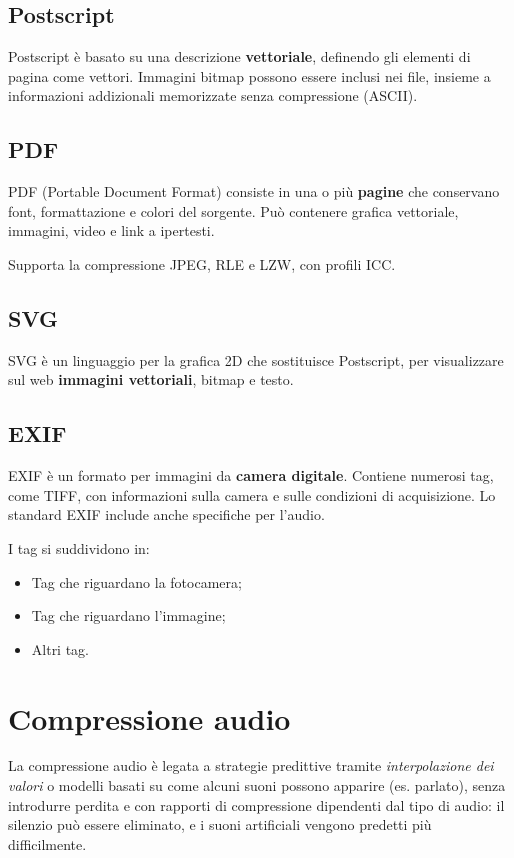  \subsection{Postscript}
 Postscript è basato su una descrizione \textbf{vettoriale}, definendo gli elementi di pagina come vettori. Immagini bitmap possono essere inclusi nei file, insieme a informazioni addizionali memorizzate senza compressione (ASCII).
 
 \subsection{PDF}
 PDF (Portable Document Format) consiste in una o più \textbf{pagine} che conservano font, formattazione e colori del sorgente. Può contenere grafica vettoriale, immagini, video e link a ipertesti.
 
 Supporta la compressione JPEG, RLE e LZW, con profili ICC.
 
 \subsection{SVG}
 SVG è un linguaggio per la grafica 2D che sostituisce Postscript, per visualizzare sul web \textbf{immagini vettoriali}, bitmap e testo.
 
 \subsection{EXIF}
 EXIF è un formato per immagini da \textbf{camera digitale}. Contiene numerosi tag, come TIFF, con informazioni sulla camera e sulle condizioni di acquisizione. Lo standard EXIF include anche specifiche per l'audio.
 
 I tag si suddividono in:
 \begin{itemize}
 	\item Tag che riguardano la fotocamera;
 	\item Tag che riguardano l'immagine;
 	\item Altri tag.
 \end{itemize}
 
 \section{Compressione audio}
 La compressione audio è legata a strategie predittive tramite \textit{interpolazione dei valori} o modelli basati su come alcuni suoni possono apparire (es. parlato), senza introdurre perdita e con rapporti di compressione dipendenti dal tipo di audio: il silenzio può essere eliminato, e i suoni artificiali vengono predetti più difficilmente.
 
